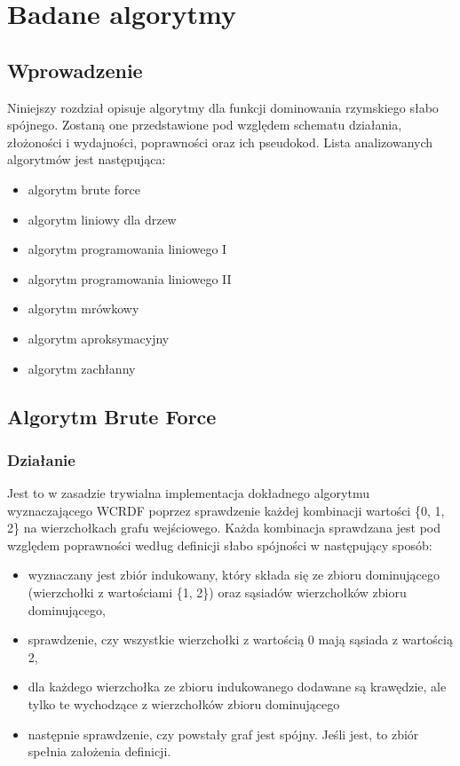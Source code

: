 \chapter{Badane algorytmy}

\section{Wprowadzenie}
Niniejszy rozdział opisuje algorytmy dla funkcji dominowania rzymskiego słabo spójnego. Zostaną one przedstawione pod względem schematu działania, złożoności i wydajności, poprawności oraz ich pseudokod. Lista analizowanych algorytmów jest następująca:

\begin{itemize}
    \item algorytm brute force
    \item algorytm liniowy dla drzew
    \item algorytm programowania liniowego I
    \item algorytm programowania liniowego II
    \item algorytm mrówkowy
    \item algorytm aproksymacyjny
    \item algorytm zachłanny
\end{itemize}

\section{Algorytm Brute Force}

\subsection{Działanie}
Jest to w zasadzie trywialna implementacja dokładnego algorytmu wyznaczającego WCRDF poprzez sprawdzenie każdej kombinacji wartości \{0, 1, 2\} na wierzchołkach grafu wejściowego. Każda kombinacja sprawdzana jest pod względem poprawności według definicji słabo spójności w następujący sposób:
\begin{itemize}
    \item wyznaczany jest zbiór indukowany, który składa się ze zbioru dominującego (wierzchołki z wartościami \{1, 2\}) oraz sąsiadów wierzchołków zbioru dominującego,
    \item sprawdzenie, czy wszystkie wierzchołki z wartością 0 mają sąsiada z wartością 2,
    \item dla każdego wierzchołka ze zbioru indukowanego dodawane są krawędzie, ale tylko te wychodzące z wierzchołków zbioru dominującego
    \item następnie sprawdzenie, czy powstały graf jest spójny. Jeśli jest, to zbiór spełnia założenia definicji.
\end{itemize}

